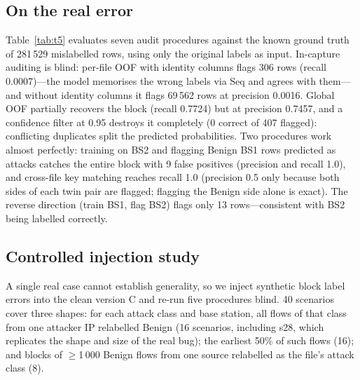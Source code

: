 \documentclass[preprint,12pt]{elsarticle}
\begin{document}
\subsection{On the real error}

Table~\ref{tab:t5} evaluates seven audit procedures against the known ground
truth of 281\,529 mislabelled rows, using only the original labels as input.
In-capture auditing is blind: per-file OOF with identity columns flags 306 rows
(recall 0.0007)---the model memorises the wrong labels via Seq and agrees with
them---and without identity columns it flags 69\,562 rows at precision 0.0016.
Global OOF partially recovers the block (recall 0.7724) but at precision
0.7457, and a confidence filter at 0.95 destroys it completely (0 correct of
407 flagged): conflicting duplicates split the predicted probabilities. Two
procedures work almost perfectly: training on BS2 and flagging Benign BS1 rows
predicted as attacks catches the entire block with 9 false positives
(precision and recall 1.0), and cross-file key matching reaches recall 1.0
(precision 0.5 only because both sides of each twin pair are flagged; flagging
the Benign side alone is exact). The reverse direction (train BS1, flag BS2)
flags only 13 rows---consistent with BS2 being labelled correctly.

\begin{table}[t]
\centering
\caption{Audit procedures on the real labelling error (original labels only;
ground truth = the 281\,529 mislabelled rows).}
\label{tab:t5}
\small
\setlength{\tabcolsep}{4pt}

\end{table}

\subsection{Controlled injection study}

A single real case cannot establish generality, so we inject synthetic block
label errors into the clean version C and re-run five procedures blind.
40 scenarios cover three shapes: for each attack class and base station, all
flows of that class from one attacker IP relabelled Benign (16 scenarios,
including s28, which replicates the shape and size of the real bug); the
earliest 50\% of such flows (16); and blocks of $\geq$1\,000 Benign flows from
one source relabelled as the file's attack class (8).
\end{document}
